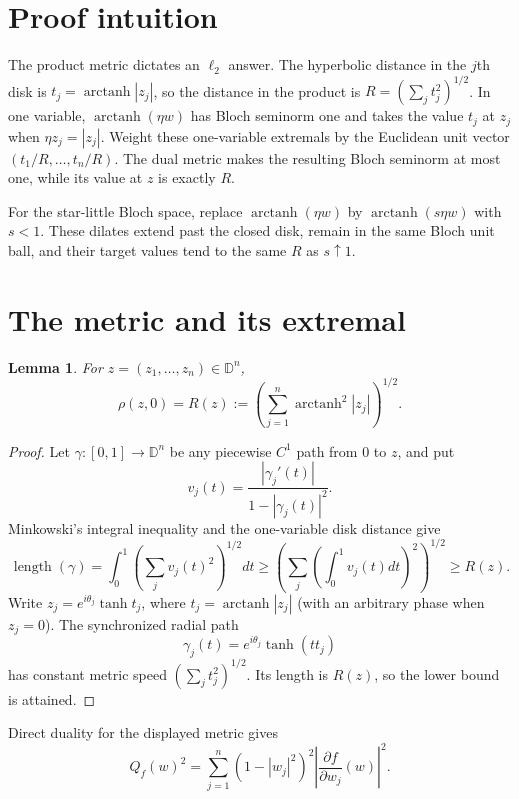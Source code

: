 \documentclass[11pt]{article}
\newtheorem{lemma}[theorem]{Lemma}
\newcommand{\D}{\mathbb D}
\newcommand{\atanh}{\operatorname{arctanh}}
\begin{document}
\section{Proof intuition}

The product metric dictates an $\ell_2$ answer.  The hyperbolic distance in
the $j$th disk is $t_j=\atanh|z_j|$, so the distance in the product is
$R=(\sum_jt_j^2)^{1/2}$.  In one variable,
$\atanh(\eta w)$ has Bloch seminorm one and takes the value $t_j$ at $z_j$
when $\eta z_j=|z_j|$.  Weight these one-variable extremals by the Euclidean
unit vector $(t_1/R,\ldots,t_n/R)$.  The dual metric makes the resulting
Bloch seminorm at most one, while its value at $z$ is exactly $R$.

For the star-little Bloch space, replace $\atanh(\eta w)$ by
$\atanh(s\eta w)$ with $s<1$.  These dilates extend past the closed disk,
remain in the same Bloch unit ball, and their target values tend to the same
$R$ as $s\uparrow1$.

\section{The metric and its extremal}

\begin{lemma}\label{lem:distance}
For $z=(z_1,\ldots,z_n)\in\D^n$,
\[
 \rho(z,0)=R(z):=\left(\sum_{j=1}^n\atanh^2|z_j|\right)^{1/2}.
\]
\end{lemma}

\begin{proof}
Let $\gamma:[0,1]\to\D^n$ be any piecewise $C^1$ path from $0$ to $z$, and
put
\[
 v_j(t)=\frac{|\gamma_j'(t)|}{1-|\gamma_j(t)|^2}.
\]
Minkowski's integral inequality and the one-variable disk distance give
\[
 \operatorname{length}(\gamma)
 =\int_0^1\left(\sum_jv_j(t)^2\right)^{1/2}dt
 \geq\left(\sum_j\left(\int_0^1v_j(t)dt\right)^2\right)^{1/2}
 \geq R(z).
\]
Write $z_j=e^{i\theta_j}\tanh t_j$, where $t_j=\atanh|z_j|$ (with an
arbitrary phase when $z_j=0$).  The synchronized radial path
\[
 \gamma_j(t)=e^{i\theta_j}\tanh(tt_j)
\]
has constant metric speed $(\sum_jt_j^2)^{1/2}$.  Its length is $R(z)$, so
the lower bound is attained.
\end{proof}

Direct duality for the displayed metric gives
\begin{equation}\label{eq:Q}
 Q_f(w)^2=\sum_{j=1}^n(1-|w_j|^2)^2
 \left|\frac{\partial f}{\partial w_j}(w)\right|^2.
\end{equation}
\end{document}
